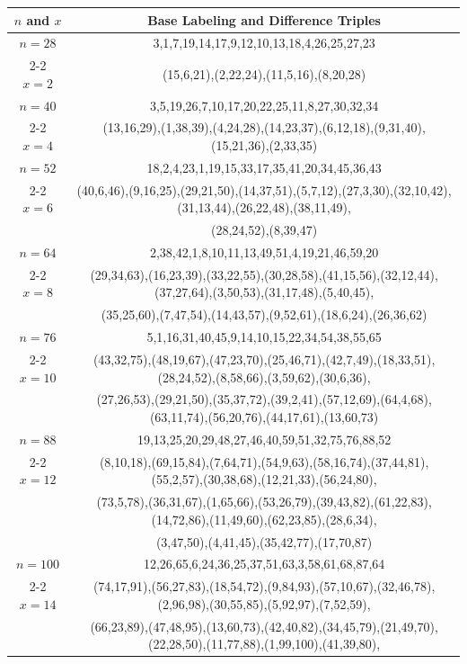 \begin{tabular}{| c | c |}
\hline
\(n\) and \(x\) & Base Labeling and Difference Triples\\
\hline
\(n=28\) & 
3,1,7,19,14,17,9,12,10,13,18,4,26,25,27,23\\
\cline{2-2}
\(x=2\)
&(15,6,21),(2,22,24),(11,5,16),(8,20,28)\\
\hline 
\(n=40\) & 
3,5,19,26,7,10,17,20,22,25,11,8,27,30,32,34\\
\cline{2-2}
\(x=4\)
&(13,16,29),(1,38,39),(4,24,28),(14,23,37),(6,12,18),(9,31,40),(15,21,36),(2,33,35)\\
\hline 
\(n=52\) & 
18,2,4,23,1,19,15,33,17,35,41,20,34,45,36,43\\
\cline{2-2}
\(x=6\)
&(40,6,46),(9,16,25),(29,21,50),(14,37,51),(5,7,12),(27,3,30),(32,10,42),(31,13,44),(26,22,48),(38,11,49),\\
&(28,24,52),(8,39,47)\\
\hline 
\(n=64\) & 
2,38,42,1,8,10,11,13,49,51,4,19,21,46,59,20\\
\cline{2-2}
\(x=8\)
&(29,34,63),(16,23,39),(33,22,55),(30,28,58),(41,15,56),(32,12,44),(37,27,64),(3,50,53),(31,17,48),(5,40,45),\\
&(35,25,60),(7,47,54),(14,43,57),(9,52,61),(18,6,24),(26,36,62)\\
\hline 
\(n=76\) & 
5,1,16,31,40,45,9,14,10,15,22,34,54,38,55,65\\
\cline{2-2}
\(x=10\)
&(43,32,75),(48,19,67),(47,23,70),(25,46,71),(42,7,49),(18,33,51),(28,24,52),(8,58,66),(3,59,62),(30,6,36),\\
&(27,26,53),(29,21,50),(35,37,72),(39,2,41),(57,12,69),(64,4,68),(63,11,74),(56,20,76),(44,17,61),(13,60,73)\\
\hline 
\(n=88\) & 
19,13,25,20,29,48,27,46,40,59,51,32,75,76,88,52\\
\cline{2-2}
\(x=12\)
&(8,10,18),(69,15,84),(7,64,71),(54,9,63),(58,16,74),(37,44,81),(55,2,57),(30,38,68),(12,21,33),(56,24,80),\\
&(73,5,78),(36,31,67),(1,65,66),(53,26,79),(39,43,82),(61,22,83),(14,72,86),(11,49,60),(62,23,85),(28,6,34),\\
&(3,47,50),(4,41,45),(35,42,77),(17,70,87)\\
\hline 
\(n=100\) & 
12,26,65,6,24,36,25,37,51,63,3,58,61,68,87,64\\
\cline{2-2}
\(x=14\)
&(74,17,91),(56,27,83),(18,54,72),(9,84,93),(57,10,67),(32,46,78),(2,96,98),(30,55,85),(5,92,97),(7,52,59),\\
&(66,23,89),(47,48,95),(13,60,73),(42,40,82),(34,45,79),(21,49,70),(22,28,50),(11,77,88),(1,99,100),(41,39,80),\\

\end{tabular}
